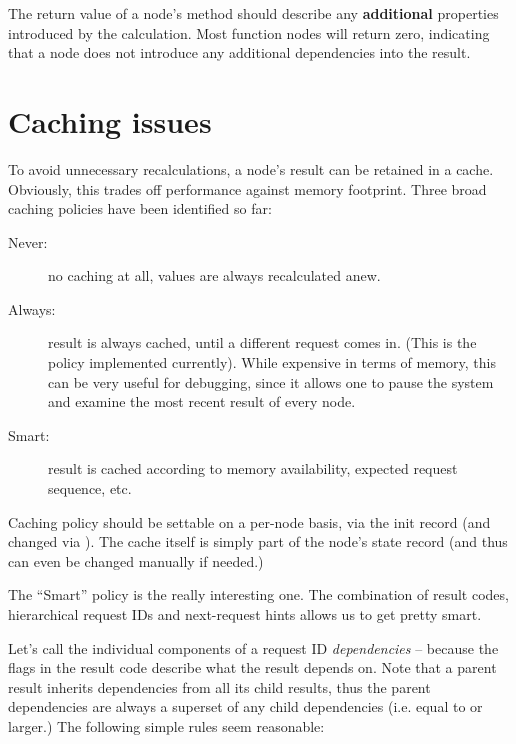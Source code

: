 \documentclass[10pt,twoside]{book}
\begin{document}
  The return value of a node's  method should describe any {\bf
  additional} properties introduced by the  calculation.
  Most function nodes will
  return zero, indicating that a node does not introduce any additional
  dependencies into the result. 
  
\section{Caching issues}

  To avoid unnecessary recalculations, a node's result can be retained in a
  cache. Obviously, this trades off performance against memory footprint. Three
  broad caching policies have been identified so far:

  \begin{description}
  
  \item[Never:] no caching at all, values are always recalculated anew. 
   
  \item[Always:] result is always cached, until a different request comes in.
    (This is the policy implemented currently). While expensive in terms of
    memory, this can be very useful for debugging, since it allows one to pause
    the system and examine the most recent result of every node.

  \item[Smart:] result is cached according to memory availability, expected
    request sequence, etc.

  \end{description}
  
  Caching policy should be settable on a per-node basis, via the init record
  (and changed via ). The cache itself is simply part of the
  node's state record (and thus can even be changed manually if needed.)
  
  The ``Smart'' policy is the really interesting one. The combination of result
  codes, hierarchical request IDs and next-request hints allows us to get
  pretty smart. 
  
  Let's call the individual components of a request ID {\em dependencies} --
  because the  flags in the result code describe what the result
  depends on. Note that a parent result inherits dependencies from all its
  child results, thus the parent dependencies are always a superset of any
  child dependencies (i.e. equal to or larger.) The following simple rules seem
  reasonable:
\end{document}
